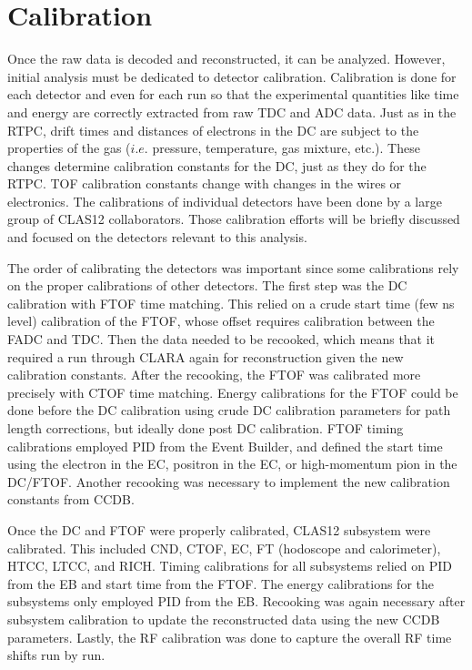 \section{Calibration}
Once the raw data is decoded and reconstructed, it can be analyzed. However, initial analysis must be dedicated to detector calibration. Calibration is done for each detector and even for each run so that the experimental quantities like time and energy are correctly extracted from raw TDC and ADC data. Just as in the RTPC, drift times and distances of electrons in the DC are subject to the properties of the gas ($i.e.$ pressure, temperature, gas mixture, etc.). These changes determine calibration constants for the DC, just as they do for the RTPC. TOF calibration constants change with changes in the wires or electronics. The calibrations of individual detectors have been done by a large group of CLAS12 collaborators. Those calibration efforts will be briefly discussed and focused on the detectors relevant to this analysis.

The order of calibrating the detectors was important since some calibrations rely on the proper calibrations of other detectors. The first step was the DC calibration with FTOF time matching. This relied on a crude start time (few ns level) calibration of the FTOF, whose offset requires calibration between the FADC and TDC. Then the data needed to be recooked, which means that it required a run through CLARA again for reconstruction given the new calibration constants. After the recooking, the FTOF was calibrated more precisely with CTOF time matching. Energy calibrations for the FTOF could be done before the DC calibration using crude DC calibration parameters for path length corrections, but ideally done post DC calibration. FTOF timing calibrations employed PID from the Event Builder, and defined the start time using the electron in the EC, positron in the EC, or high-momentum pion in the DC/FTOF. Another recooking was necessary to implement the new calibration constants from CCDB.

Once the DC and FTOF were properly calibrated, CLAS12 subsystem were calibrated. This included CND, CTOF, EC, FT (hodoscope and calorimeter), HTCC, LTCC, and RICH. Timing calibrations for all subsystems relied on PID from the EB and start time from the FTOF. The energy calibrations for the subsystems only employed PID from the EB. Recooking was again necessary after subsystem calibration to update the reconstructed data using the new CCDB parameters. Lastly, the RF calibration was done to capture the overall RF time shifts run by run. 


